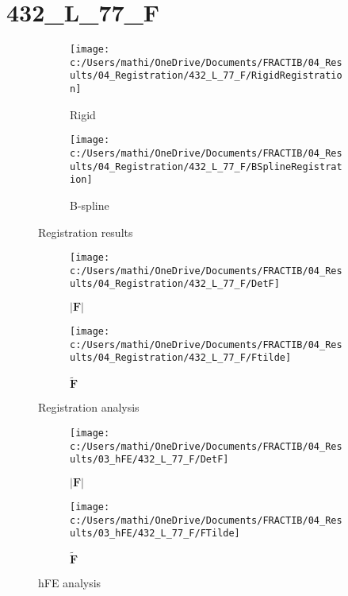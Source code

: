 \documentclass{article}%
\begin{document}
%
\normalsize%
\section*{432\_L\_77\_F}%
\label{sec:432L77F}%


\begin{figure}[h!]%
\begin{subfigure}[b]{0.5\linewidth}%
\texttt{[image: c:/Users/mathi/OneDrive/Documents/FRACTIB/04\_Results/04\_Registration/432\_L\_77\_F/RigidRegistration]}%
\caption{Rigid}%
\end{subfigure}%
\begin{subfigure}[b]{0.5\linewidth}%
\texttt{[image: c:/Users/mathi/OneDrive/Documents/FRACTIB/04\_Results/04\_Registration/432\_L\_77\_F/BSplineRegistration]}%
\caption{B{-}spline}%
\end{subfigure}%
\caption{Registration results}%
\end{figure}

%


\begin{figure}[h!]%
\begin{subfigure}[b]{0.5\linewidth}%
\texttt{[image: c:/Users/mathi/OneDrive/Documents/FRACTIB/04\_Results/04\_Registration/432\_L\_77\_F/DetF]}%
\caption{$|\mathbf{F}|$}%
\end{subfigure}%
\begin{subfigure}[b]{0.5\linewidth}%
\texttt{[image: c:/Users/mathi/OneDrive/Documents/FRACTIB/04\_Results/04\_Registration/432\_L\_77\_F/Ftilde]}%
\caption{$\tilde{\mathbf{F}}$}%
\end{subfigure}%
\caption{Registration analysis}%
\end{figure}

%


\begin{figure}[h!]%
\begin{subfigure}[b]{0.5\linewidth}%
\texttt{[image: c:/Users/mathi/OneDrive/Documents/FRACTIB/04\_Results/03\_hFE/432\_L\_77\_F/DetF]}%
\caption{$|\mathbf{F}|$}%
\end{subfigure}%
\begin{subfigure}[b]{0.5\linewidth}%
\texttt{[image: c:/Users/mathi/OneDrive/Documents/FRACTIB/04\_Results/03\_hFE/432\_L\_77\_F/FTilde]}%
\caption{$\tilde{\mathbf{F}}$}%
\end{subfigure}%
\caption{hFE analysis}%
\end{figure}
\end{document}
